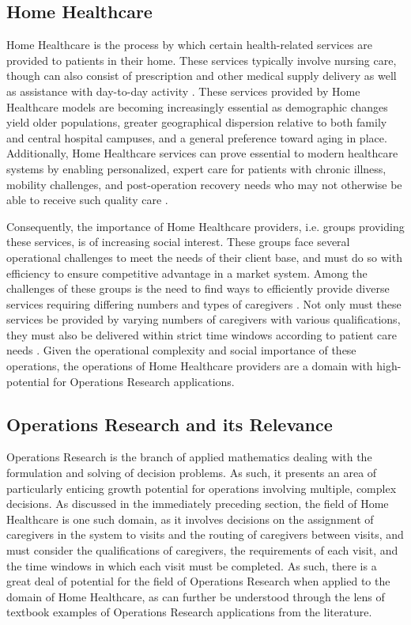\documentclass[11pt,twoside]{article}
\numberwithin{Theorem}{section}
\numberwithin{Definition}{section}
\numberwithin{Lemma}{section}
\numberwithin{Algorithm}{section}
\numberwithin{equation}{section}
\begin{document}
\subsection{Home Healthcare}
Home Healthcare is the process by which certain health-related services are provided to patients in their home. These services typically involve nursing care, though can also consist of prescription and other medical supply delivery as well as assistance with day-to-day activity \cite{al-hamad}. These services provided by Home Healthcare models are becoming increasingly essential as demographic changes yield older populations, greater geographical dispersion relative to both family and central hospital campuses, and a general preference toward aging in place. Additionally, Home Healthcare services can prove essential to modern healthcare systems by enabling personalized, expert care for patients with chronic illness, mobility challenges, and post-operation recovery needs who may not otherwise be able to receive such quality care \cite{atta25, Mankowska2014}.

Consequently, the importance of Home Healthcare providers, i.e. groups providing these services, is of increasing social interest. These groups face several operational challenges to meet the needs of their client base, and must do so with efficiency to ensure competitive advantage in a market system. Among the challenges of these groups is the need to find ways to efficiently provide diverse services requiring differing numbers and types of caregivers \cite{begur97, Mankowska2014}. Not only must these services be provided by varying numbers of caregivers with various qualifications, they must also be delivered within strict time windows according to patient care needs \cite{begur97}. Given the operational complexity and social importance of these operations, the operations of Home Healthcare providers are a domain with high-potential for Operations Research applications.

\subsection{Operations Research and its Relevance}

Operations Research is the branch of applied mathematics dealing with the formulation and solving of decision problems. As such, it presents an area of particularly enticing growth potential for operations involving multiple, complex decisions. As discussed in the immediately preceding section, the field of Home Healthcare is one such domain, as it involves decisions on the assignment of caregivers in the system to visits and the routing of caregivers between visits, and must consider the qualifications of caregivers, the requirements of each visit, and the time windows in which each visit must be completed. As such, there is a great deal of potential for the field of Operations Research when applied to the domain of Home Healthcare, as can further be understood through the lens of textbook examples of Operations Research applications from the literature. 
\end{document}
